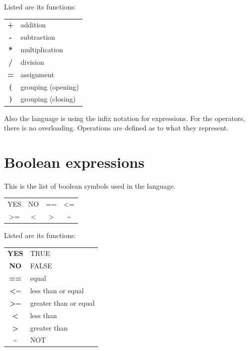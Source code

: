 \documentclass[11pt,a4paper]{report}
\begin{document}
\noindent Listed are its functions:

\begin{center}
\begin{tabular}{ c l }
  \textbf{+} & addition\\
  \textbf{-} & subtraction\\
  \textbf{*} & multiplication\\
  \textbf{/} & division\\
  \textbf{=} & assignment\\
  \textbf{(} & grouping (opening)\\
  \textbf{)} & grouping (closing)
\end{tabular}
\end{center}

Also the language is using the infix notation for expressions. For the
operators, there is no overloading. Operations are defined as to what they
represent.

\section{Boolean expressions}

This is the list of boolean symbols used in the language.

\begin{center}
\begin{tabular}{ c c c c }
 YES & NO & == & \textless = \\
 \textgreater = & \textless & \textgreater & \textasciitilde
\end{tabular}
\end{center}

\noindent Listed are its functions:

\begin{center}
\begin{tabular}{ c l }
  \textbf{YES} & TRUE\\
  \textbf{NO} & FALSE\\
  \textbf{==} & equal\\
  \textbf{\textless}= & less than or equal\\
  \textbf{\textgreater}= & greater than or equal\\
  \textbf{\textless} & less than\\
  \textbf{\textgreater} & greater than\\
  \textbf{\textasciitilde} & NOT
\end{tabular}
\end{center}
\end{document}
